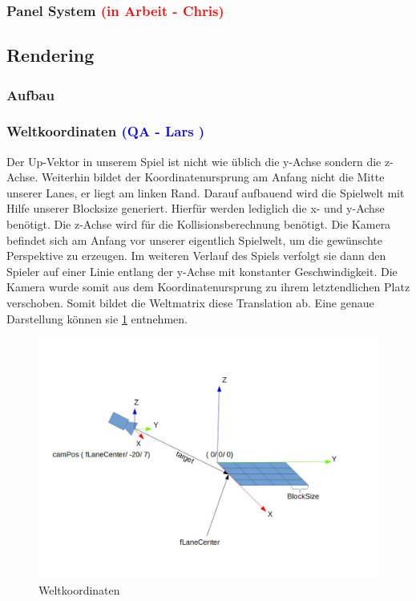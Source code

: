 \documentclass{article}
\begin{document}
\vspace{1cm}
\subsubsection{Panel System \textcolor{red}{(in Arbeit - Chris)}}

\vspace{2cm}
\subsection{Rendering}

\vspace{1cm}
\subsubsection{Aufbau}

\vspace{1cm}
\subsubsection{Weltkoordinaten \textcolor{blue}{(QA - Lars )}}

Der Up-Vektor in unserem Spiel ist nicht wie üblich die y-Achse sondern die z-Achse. Weiterhin bildet der Koordinatenursprung am 
Anfang nicht die Mitte unserer Lanes, er liegt am linken Rand. Darauf aufbauend wird die Spielwelt mit Hilfe unserer Blocksize generiert. Hierfür 
werden lediglich die x- und y-Achse benötigt. Die z-Achse wird für die Kollisionsberechnung benötigt. Die Kamera befindet sich am Anfang 
vor unserer eigentlich Spielwelt, um die gewünschte Perspektive zu erzeugen. Im weiteren Verlauf des Spiels verfolgt sie dann den Spieler
auf einer Linie entlang der y-Achse mit konstanter Geschwindigkeit. Die Kamera wurde somit aus dem Koordinatenursprung zu ihrem letztendlichen
Platz verschoben. Somit bildet die Weltmatrix diese Translation ab. Eine genaue Darstellung können sie \ref{fig:coordinates} entnehmen.

\begin{figure}
	\centering
	\includegraphics[width=1\textwidth]{Weltkoordinaten}
	\caption{Weltkoordinaten
		\label{fig:coordinates}}
\end{figure}
\end{document}
